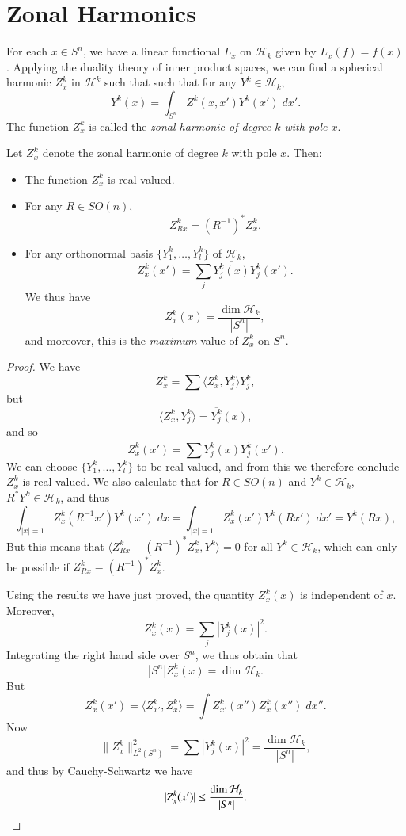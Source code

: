 \section{Zonal Harmonics}

For each $x \in S^n$, we have a linear functional $L_x$ on $\mathcal{H}_k$ given by $L_x(f) = f(x)$. Applying the duality theory of inner product spaces, we can find a spherical harmonic $Z^k_x$ in $\mathcal{H}^k$ such that such that for any $Y^k \in \mathcal{H}_k$,
%
\[ Y^k(x) = \int_{S^n} Z^k(x,x') Y^k(x')\; dx'. \]
%
The function $Z^k_x$ is called the \emph{zonal harmonic of degree $k$ with pole $x$}.

\begin{theorem}
    Let $Z^k_x$ denote the zonal harmonic of degree $k$ with pole $x$. Then:
    \begin{itemize}
        \item The function $Z^k_x$ is real-valued.

        \item For any $R \in SO(n)$,
        \[ Z^k_{Rx} = (R^{-1})^* Z^k_x. \]

        \item For any orthonormal basis $\{ Y^k_1, \dots, Y^k_l \}$ of $\mathcal{H}_k$,
        \[ Z^k_x(x') = \sum_j \overline{Y^k_j(x)} Y^k_j(x'). \]
        We thus have
        \[ Z^k_x(x) = \frac{\dim \mathcal{H}_k}{|S^n|}, \]
        and moreover, this is the \emph{maximum} value of $Z^k_x$ on $S^n$.
    \end{itemize}
\end{theorem}
\begin{proof}
    We have
    \[ Z^k_x = \sum \langle Z^k_x, Y^k_j \rangle Y^k_j, \]
    but
    \[ \langle Z^k_x, Y^k_j \rangle = \overline{Y^k_j}(x), \]
    and so
    \[ Z^k_x(x') = \sum \overline{Y^k_j}(x) Y^k_j(x'). \]
    We can choose $\{ Y^k_1, \dots, Y^k_l \}$ to be real-valued, and from this we therefore conclude $Z^k_x$ is real valued. We also calculate that for $R \in SO(n)$ and $Y^k \in \mathcal{H}_k$, $R^* Y^k \in \mathcal{H}_k$, and thus
    \[ \int_{|x| = 1} Z^k_x(R^{-1} x') Y^k(x')\; dx = \int_{|x| = 1} Z^k_x(x') Y^k(Rx')\; dx' = Y^k(R x), \]
    But this means that $\langle Z^k_{Rx} - (R^{-1})^* Z^k_x, Y^k \rangle = 0$ for all $Y^k \in \mathcal{H}_k$, which can only be possible if $Z^k_{Rx} = (R^{-1})^* Z^k_x$.

    Using the results we have just proved, the quantity $Z^k_x(x)$ is independent of $x$. Moreover,
    \[ Z^k_x(x) = \sum_j |Y^k_j(x)|^2. \]
    Integrating the right hand side over $S^n$, we thus obtain that
    \[ |S^n| Z^k_x(x) = \dim \mathcal{H}_k. \]
    But
    \[ Z^k_x(x') = \langle Z^k_{x'}, Z^k_x \rangle = \int Z^k_{x'}(x'') Z^k_x(x'')\; dx''. \]
    Now
    \[ \| Z^k_x \|_{L^2(S^n)}^2 = \sum |Y^k_j(x)|^2 = \frac{\dim \mathcal{H}_k}{|S^n|}, \]
    and thus by Cauchy-Schwartz we have
    \[ |Z^k_x(x')| \leq \frac{\dim \mathcal{H}_k}{|S^n|}. \qedhere \]
\end{proof}

